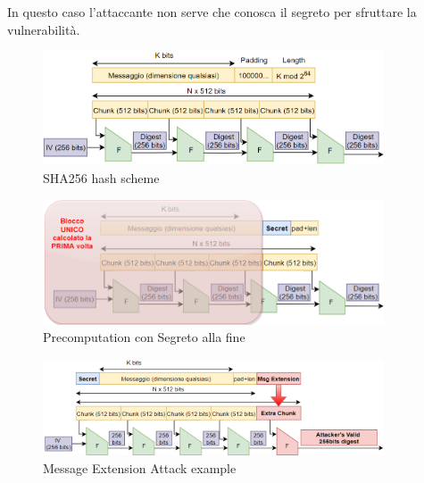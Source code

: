 \begin{note}
    In questo caso l'attaccante non serve che conosca il segreto per sfruttare la vulnerabilità.
\end{note}
\begin{figure}[h]
    \centering
    \includegraphics[width=0.9\textwidth]{image/sha256.png}
    \caption{SHA256 hash scheme}
    \label{fig:sha256}
\end{figure}
\begin{figure}[h]
    \centering
    \includegraphics[width=0.9\textwidth]{image/stateprecomp.png}
    \caption{Precomputation con Segreto alla fine}
    \label{fig:secretprecomp}
\end{figure}
\begin{figure}[h]
    \centering
    \includegraphics[width=0.9\textwidth]{image/macmsgext.png}
    \caption{Message Extension Attack example}
    \label{fig:macmsgext}
\end{figure}
